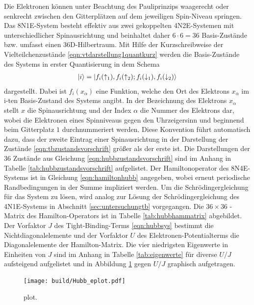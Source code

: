 Die Elektronen können unter Beachtung des Pauliprinzips waagerecht oder senkrecht zwischen den Gitterplätzen auf dem jeweiligen Spin-Niveau springen.
Das 8N1E-System besteht effektiv aus zwei gekoppelten 4N2E-Systemen mit unterschiedlicher Spinausrichtung und
beinhaltet daher $6 \cdot 6=36$ Basis-Zustände bzw. umfasst einen 36D-Hilbertraum.
Mit Hilfe der Kurzschreibweise der Vielteilchenzustände \eqref{eqn:vtdarstellung1quantkurz} werden die Basis-Zustände des Systems in erster Quantisierung in dem Schema
\begin{align}
  \ket{i} = \ket{f_i(\uparrow_1),f_i(\uparrow_2); f_i(\downarrow_1),f_i(\downarrow_2)}
  \label{eqn:hubbzustandsvorschrift}
\end{align}
dargestellt. Dabei ist $f_i(x_\alpha)$ eine Funktion, welche den Ort des Elektrons $x_\alpha$ im i-ten Basis-Zustand des Systems angibt.
In der Bezeichnung des Elektrons $x_\alpha$ stellt $x$ die Spinausrichtung und der Index $\alpha$ die Nummer des Elektrons dar, wobei die Elektronen eines Spinniveaus gegen den Uhrzeigersinn und beginnend beim Gitterplatz $1$ durchnummeriert werden.
Diese Konvention führt automatisch dazu, dass der zweite Eintrag einer Spinausrichtung in der Darstellung der Zustände \eqref{eqn:tbzustandsvorschrift} größer als der erste ist.
Die Darstellungen der $36$ Zustände aus Gleichung \eqref{eqn:hubbzustandsvorschrift} sind im Anhang in Tabelle \ref{tab:hubbzustandsvorschrift} aufgelistet.
Der Hamiltonoperator des 8N4E-Systems ist in Gleichung \eqref{eqn:hamiltonhubb} angegeben, wobei erneut periodische Randbedingungen in der Summe impliziert werden.
Um die Schrödingergleichung für das System zu lösen, wird analog zur Lösung der Schrödingergleichung des 4N1E-Systems in Abschnitt \ref{sec:untersuchungtb} vorgegangen.
Die $36 \times 36$ -Matrix des Hamilton-Operators ist in Tabelle \ref{tab:hubbhammatrix} abgebildet.
Der Vorfaktor $J$ des Tight-Binding-Terms \eqref{eqn:hubbsys} bestimmt die Nichtdiagonalelemente und der
Vorfaktor $U$ des Elektronen-Potentialterms die Diagonalelemente der Hamilton-Matrix.
Die vier niedrigsten Eigenwerte in Einheiten von $J$ sind im Anhang in Tabelle \ref{tab:eigenwerte} für diverse $U/J$ aufsteigend aufgelistet und in Abbildung \ref{fig:eplot} gegen $U/J$ graphisch aufgetragen.

\begin{figure}
  \centering
  \texttt{[image: build/Hubb\_eplot.pdf]}
  \caption{plot.}
  \label{fig:eplot}
\end{figure}


